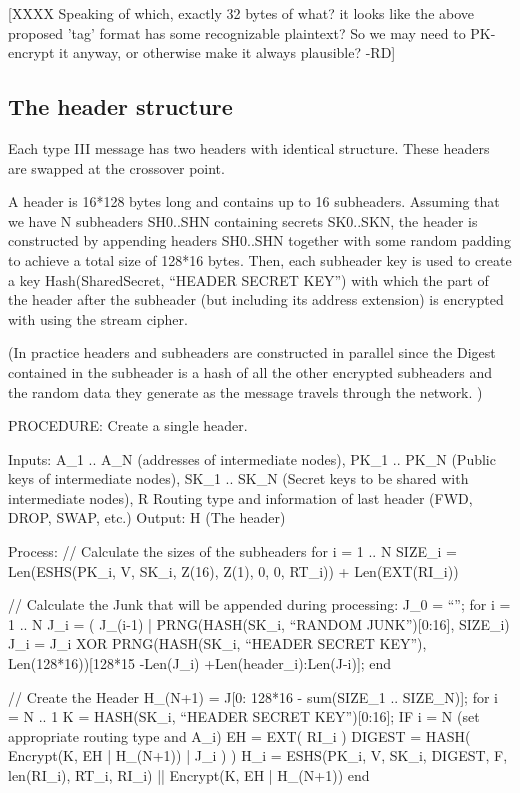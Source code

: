 [XXXX Speaking of which, exactly 32 bytes of what? it looks like the
      above proposed 'tag' format has some recognizable plaintext? So
      we may need to PK-encrypt it anyway, or otherwise make it always
      plausible? -RD]


\subsection{The header structure}

Each type III message has two headers with identical structure. These
headers are swapped at the crossover point.

A header is 16*128 bytes long and contains up to 16
subheaders. Assuming that we have N subheaders SH0..SHN containing
secrets SK0..SKN, the header is constructed by appending headers
SH0..SHN together with some random padding to achieve a total size
of 128*16 bytes. Then, each subheader key is used to create a key
Hash(SharedSecret, ``HEADER SECRET KEY'') with which the part of the
header after the subheader (but including its address extension) is
encrypted with using the stream cipher. 

(In practice headers and subheaders are constructed in parallel since
the Digest contained in the subheader is a hash of all the other
encrypted subheaders and the random data they generate as the message
travels through the network. )

PROCEDURE: Create a single header.

Inputs: A_1 .. A_N (addresses of intermediate nodes), 
	PK_1 .. PK_N (Public keys of intermediate nodes),
	SK_1 .. SK_N (Secret keys to be shared with intermediate nodes),
        R Routing type and information of last header (FWD, DROP, SWAP, etc.)
Output: H (The header)

Process: 
  // Calculate the sizes of the subheaders
  for i = 1 .. N
	SIZE_i = Len(ESHS(PK_i, V, SK_i, Z(16), Z(1), 0, 0, RT_i))
                    + Len(EXT(RI_i))

  // Calculate the Junk that will be appended during processing:
  J_0 = ``'';
  for i = 1 .. N
	J_i = ( J_(i-1) | PRNG(HASH(SK_i, ``RANDOM JUNK'')[0:16], SIZE_i)
	J_i = J_i XOR PRNG(HASH(SK_i, ``HEADER SECRET KEY''),
  		Len(128*16))[128*15 -Len(J_i) +Len(header_i):Len(J-i)];
  end

  // Create the Header
  H_(N+1) = J[0: 128*16 - sum(SIZE_1 .. SIZE_N)];
  for i = N .. 1
	K = HASH(SK_i, ``HEADER SECRET KEY'')[0:16];
	IF i = N (set appropriate routing type and A_i)
	EH = EXT( RI_i )
  	DIGEST = HASH( Encrypt(K, EH | H_(N+1)) | J_i ) )
	H_i = ESHS(PK_i, V, SK_i, DIGEST, F, len(RI_i), RT_i, RI_i)
                  || Encrypt(K, EH | H_(N+1))
  end

